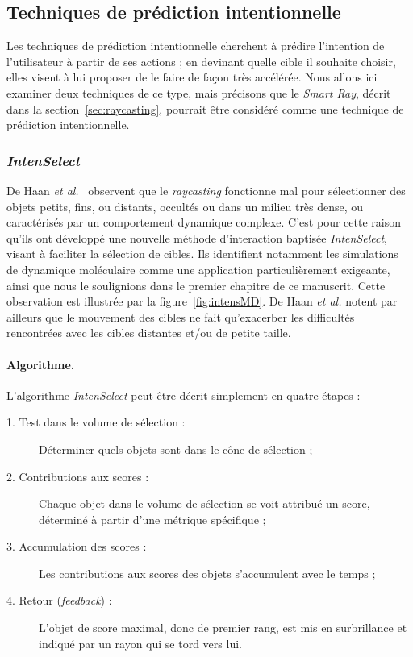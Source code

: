 	\subsection{Techniques de prédiction intentionnelle}
	Les techniques de prédiction intentionnelle cherchent à prédire l'intention de l'utilisateur à partir de ses actions ; en \og devinant \fg{} quelle cible il souhaite choisir, elles visent à lui proposer de le faire de façon très accélérée. Nous allons ici examiner deux techniques de ce type, mais précisons que le \emph{Smart Ray}, décrit dans la section~\ref{sec:raycasting}, pourrait être considéré comme une technique de prédiction intentionnelle.
	
	\subsubsection{\emph{IntenSelect}}
	\label{sub:intenSelect}
	De Haan \emph{et al.}~\cite{de2005intenselect} observent que le \emph{raycasting} fonctionne mal pour sélectionner des objets petits, fins, ou distants, occultés ou dans un milieu très dense, ou caractérisés par un comportement dynamique complexe. C'est pour cette raison qu'ils ont développé une nouvelle méthode d'interaction baptisée \emph{IntenSelect}, visant à faciliter la sélection de cibles. Ils identifient notamment les simulations de dynamique moléculaire comme une application particulièrement exigeante, ainsi que nous le soulignions dans le premier chapitre de ce manuscrit. Cette observation est illustrée par la figure~\ref{fig:intensMD}. De Haan \emph{et al.} notent par ailleurs que le mouvement des cibles ne fait qu'exacerber les difficultés rencontrées avec les cibles distantes et/ou de petite taille.
	
	\paragraph{Algorithme.}
	L'algorithme \emph{IntenSelect} peut être décrit simplement en quatre étapes :
	
	\begin{description}
		\item[1. Test dans le volume de sélection :] Déterminer quels objets sont dans le cône de sélection ;
		\item[2. Contributions aux scores :] Chaque objet dans le volume de sélection se voit attribué un score, déterminé à partir d'une métrique spécifique ;
		\item[3. Accumulation des scores :] Les contributions aux scores des objets s'accumulent avec le temps ;
		\item[4. Retour (\emph{feedback}) :] L'objet de score maximal, donc de premier rang, est mis en surbrillance et indiqué par un rayon qui se \og tord \fg{} vers lui.
	\end{description}
	
